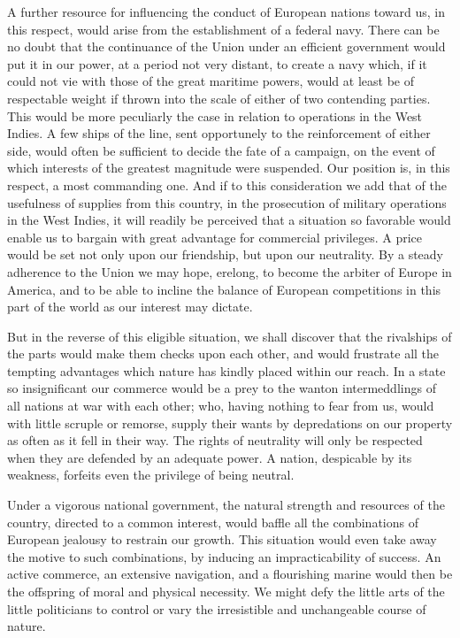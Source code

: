 A further resource for influencing the conduct of European nations toward us, in this respect, would arise from the establishment of a federal navy. 
There can be no doubt that the continuance of the Union under an efficient government would put it in our power, at a period not very distant, to create a navy which, if it could not vie with those of the great maritime powers, would at least be of respectable weight if thrown into the scale of either of two contending parties. 
This would be more peculiarly the case in relation to operations in the West Indies. 
A few ships of the line, sent opportunely to the reinforcement of either side, would often be sufficient to decide the fate of a campaign, on the event of which interests of the greatest magnitude were suspended. 
Our position is, in this respect, a most commanding one. 
And if to this consideration we add that of the usefulness of supplies from this country, in the prosecution of military operations in the West Indies, it will readily be perceived that a situation so favorable would enable us to bargain with great advantage for commercial privileges. 
A price would be set not only upon our friendship, but upon our neutrality. 
By a steady adherence to the Union we may hope, erelong, to become the arbiter of Europe in America, and to be able to incline the balance of European competitions in this part of the world as our interest may dictate.

But in the reverse of this eligible situation, we shall discover that the rivalships of the parts would make them checks upon each other, and would frustrate all the tempting advantages which nature has kindly placed within our reach. 
In a state so insignificant our commerce would be a prey to the wanton intermeddlings of all nations at war with each other; who, having nothing to fear from us, would with little scruple or remorse, supply their wants by depredations on our property as often as it fell in their way. 
The rights of neutrality will only be respected when they are defended by an adequate power. 
A nation, despicable by its weakness, forfeits even the privilege of being neutral.

Under a vigorous national government, the natural strength and resources of the country, directed to a common interest, would baffle all the combinations of European jealousy to restrain our growth. 
This situation would even take away the motive to such combinations, by inducing an impracticability of success. 
An active commerce, an extensive navigation, and a flourishing marine would then be the offspring of moral and physical necessity. 
We might defy the little arts of the little politicians to control or vary the irresistible and unchangeable course of nature.

